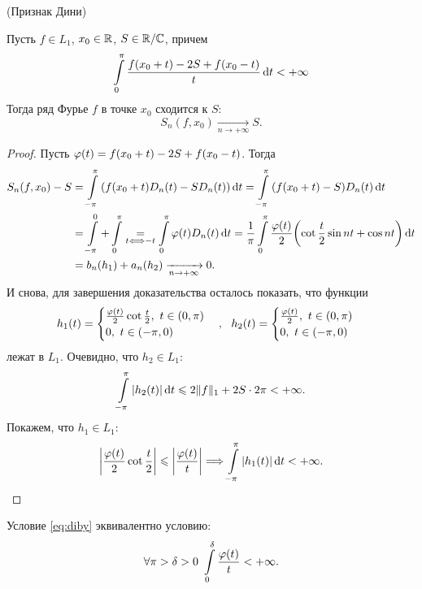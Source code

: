 \begin{theorem}(Признак Дини)

    Пусть $f \in L_1$, $x_0 \in \R$, $S \in \R/\mathbb{C}$, причем
    \begin{equation}
        \intl_0^\pi{\frac{f(x_0 + t) - 2S + f(x_0 - t)}{t} \dd t} < +\infty 
        \label{eq:diby}
    \end{equation}
    Тогда ряд Фурье $f$ в точке $x_0$ сходится к $S$:
    \[
        S_n(f, x_0) \xrightarrow[n \to +\infty]{} S
    .\]
\end{theorem}
\begin{proof}
    Пусть $\f(t) = f(x_0 + t) - 2S + f(x_0 - t)$. Тогда
    \begin{align*}
        S_n(f, x_0) - S 
        &= \intl_{-\pi}^\pi{\parens*{f(x_0 + t) D_n(t) - S D_n(t)} \dd t} = 
        \intl_{-\pi}^\pi{(f(x_0 + t) - S) D_n(t) \dd t} \\
        &= \intl_{-\pi}^0 + \intl_{0}^\pi \underset{t \Llra -t}{=} 
        \intl_{0}^\pi{\f(t) D_n(t) \dd t} = \frac{1}{\pi} \intl_0^\pi{
        \frac{\f(t)}{2} \parens*{\cot{\frac{t}{2}} \sin{nt} + \cos{nt}} \dd t} \\
        &= b_n(h_1) + a_n(h_2) \xrightarrow[n \to +\infty]{} 0
    .\end{align*}
    И снова, для завершения доказательства осталось показать, что функции
    \[
        h_1(t) = \begin{cases}
            \frac{\f(t)}{2} \cot{\frac{t}{2}},~ t \in (0, \pi) \\
            0,~ t \in (-\pi, 0)
        \end{cases},~~
        h_2(t) = \begin{cases}
            \frac{\f(t)}{2},~ t \in (0, \pi) \\
            0,~ t \in (-\pi, 0)
        \end{cases}
    \]
    лежат в $L_1$. Очевидно, что $h_2 \in L_1$:
    \[
        \intl_{-\pi}^\pi{|h_2(t)| \dd t} \leqslant 2 \norm{f}_1 + 2S \cdot 2 \pi
        < +\infty
    .\]
    Покажем, что $h_1 \in L_1$:
    \[
        \abs*{\frac{\f(t)}{2} \cot{\frac{t}{2}}} \leqslant \abs*{\frac{\f(t)}{t}}
        \Lra \intl_{-\pi}^\pi{|h_1(t)| \dd t} < +\infty
    .\]
\end{proof}

\begin{remark}
    Условие \ref{eq:diby} эквивалентно условию:
    \[
        \forall \pi > \delta > 0~ \intl_0^\delta{\frac{\f(t)}{t}} < +\infty
    .\]
\end{remark}

